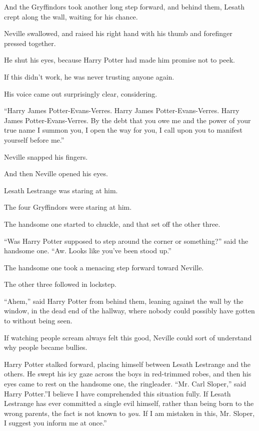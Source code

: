 And the Gryffindors took another long step forward, and behind them,
Lesath crept along the wall, waiting for his chance.

Neville swallowed, and raised his right hand with his thumb and
forefinger pressed together.

He shut his eyes, because Harry Potter had made him promise not to peek.

If this didn't work, he was never trusting anyone again.

His voice came out surprisingly clear, considering.

``Harry James Potter-Evans-Verres. Harry James Potter-Evans-Verres.
Harry James Potter-Evans-Verres. By the debt that you owe me and the
power of your true name I summon you, I open the way for you, I call
upon you to manifest yourself before me.''

Neville snapped his fingers.

And then Neville opened his eyes.

Lesath Lestrange was staring at him.

The four Gryffindors were staring at him.

The handsome one started to chuckle, and that set off the other three.

``Was Harry Potter supposed to step around the corner or something?''
said the handsome one. ``Aw. Looks like you've been stood up.''

The handsome one took a menacing step forward toward Neville.

The other three followed in lockstep.

``Ahem,'' said Harry Potter from behind them, leaning against the wall
by the window, in the dead end of the hallway, where nobody could
possibly have gotten to without being seen.

If watching people scream always felt this good, Neville could sort of
understand why people became bullies.

Harry Potter stalked forward, placing himself between Lesath Lestrange
and the others. He swept his icy gaze across the boys in red-trimmed
robes, and then his eyes came to rest on the handsome one, the
ringleader. ``Mr. Carl Sloper,'' said Harry Potter.''I believe I have
comprehended this situation fully. If Lesath Lestrange has ever
committed a single evil himself, rather than being born to the wrong
parents, the fact is not known to \emph{you.} If I am mistaken in this,
Mr. Sloper, I suggest you inform me at once.''

